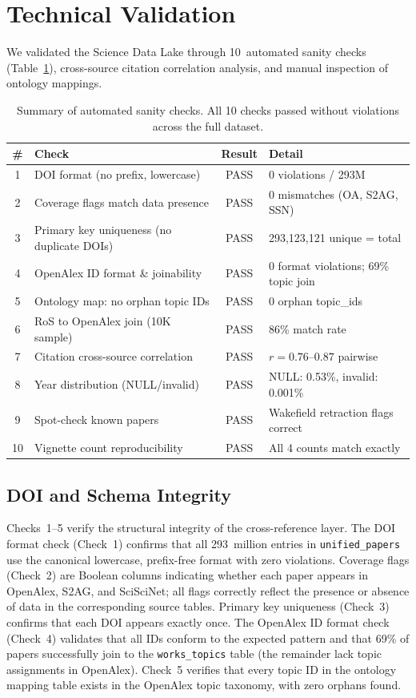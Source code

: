 \section{Technical Validation}
\label{sec:validation}

We validated the Science Data Lake through 10~automated sanity checks
(Table~\ref{tab:sanity}), cross-source citation correlation analysis, and manual
inspection of ontology mappings.

\begin{table}[t]
\centering
\caption{Summary of automated sanity checks. All 10 checks passed without
violations across the full dataset.}
\label{tab:sanity}
\small
\begin{tabularx}{\textwidth}{@{}c l c X@{}}
\toprule
\textbf{\#} & \textbf{Check} & \textbf{Result} & \textbf{Detail} \\
\midrule
1  & DOI format (no prefix, lowercase) & PASS & 0 violations / 293M \\
2  & Coverage flags match data presence & PASS & 0 mismatches (OA, S2AG, SSN) \\
3  & Primary key uniqueness (no duplicate DOIs) & PASS & 293,123,121 unique = total \\
4  & OpenAlex ID format \& joinability & PASS & 0 format violations; 69\% topic join \\
5  & Ontology map: no orphan topic IDs & PASS & 0 orphan topic\_ids \\
6  & RoS to OpenAlex join (10K sample) & PASS & 86\% match rate \\
7  & Citation cross-source correlation & PASS & $r = 0.76$--$0.87$ pairwise \\
8  & Year distribution (NULL/invalid) & PASS & NULL: 0.53\%, invalid: 0.001\% \\
9  & Spot-check known papers & PASS & Wakefield retraction flags correct \\
10 & Vignette count reproducibility & PASS & All 4 counts match exactly \\
\bottomrule
\end{tabularx}
\end{table}

\subsection{DOI and Schema Integrity}

Checks~1--5 verify the structural integrity of the cross-reference layer.
The DOI format check (Check~1) confirms that all 293~million entries in
\texttt{unified\_papers} use the canonical lowercase, prefix-free format
with zero violations. Coverage flags (Check~2) are Boolean columns indicating
whether each paper appears in OpenAlex, S2AG, and SciSciNet; all flags
correctly reflect the presence or absence of data in the corresponding
source tables. Primary key uniqueness (Check~3) confirms that each DOI
appears exactly once. The OpenAlex ID format check (Check~4) validates that
all IDs conform to the expected pattern and that 69\% of papers successfully
join to the \texttt{works\_topics} table (the remainder lack topic
assignments in OpenAlex). Check~5 verifies that every topic ID in the
ontology mapping table exists in the OpenAlex topic taxonomy, with zero
orphans found.

